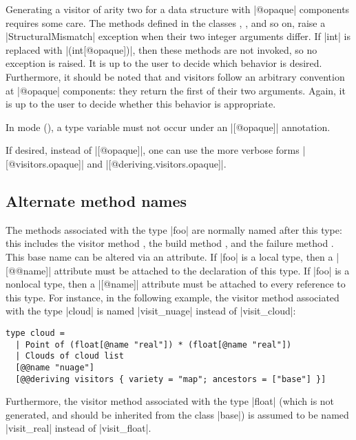 \documentclass[11pt,a4paper,twoside]{article}
\begin{document}
Generating a visitor of arity two for a data structure with \oc|@opaque|
components requires some care. The methods  defined in the
classes , , and so on, raise a
\oc|StructuralMismatch| exception when their two integer arguments differ. If
\oc|int| is replaced with \oc|(int[@opaque])|, then these methods are not
invoked, so no exception is raised. It is up to the user to decide which
behavior is desired. Furthermore, it should be noted that \maptwo and \foldtwo
visitors follow an arbitrary convention at \oc|@opaque| components: they
return the first of their two arguments. Again, it is up to the user to decide
whether this behavior is appropriate.

In \polymorphic mode (), a type variable
must not occur under an \oc|[@opaque]| annotation.

If desired, instead of \oc|[@opaque]|, one can use the more verbose forms
\oc|[@visitors.opaque]| and \oc|[@deriving.visitors.opaque]|.


\subsection{Alternate method names}
\label{sec:name}

The methods associated with the type \oc|foo| are normally named after this
type: this includes the visitor method , the build method
,
and the failure method .
This base name can be altered via an attribute. If \oc|foo| is a local type,
then a \oc|[@@name]| attribute must be attached to the declaration of this
type. If \oc|foo| is a nonlocal type, then a \oc|[@name]| attribute must be
attached to every reference to this type. For instance, in the following
example,
the visitor method associated with the type \oc|cloud| is named
\oc|visit_nuage| instead of \oc|visit_cloud|:
%
\begin{origenv}
\begin{lstlisting}
type cloud =
  | Point of (float[@name "real"]) * (float[@name "real"])
  | Clouds of cloud list
  [@@name "nuage"]
  [@@deriving visitors { variety = "map"; ancestors = ["base"] }]
\end{lstlisting}
\end{origenv}
%
Furthermore, the visitor method associated with the type \oc|float|
(which is not generated, and should be inherited from the class \oc|base|)
is assumed to be named \oc|visit_real| instead of \oc|visit_float|.
\end{document}
